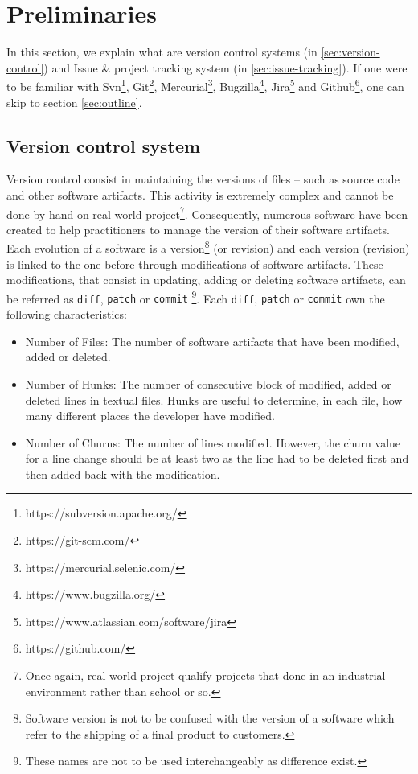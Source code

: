 \section{Preliminaries\label{sec:preliminaries}}


In this section, we explain what are version control systems (in \ref{sec:version-control}) and Issue \& project tracking system (in \ref{sec:issue-tracking}). If one were to be familiar with Svn\footnote{https://subversion.apache.org/}, Git\footnote{https://git-scm.com/}, Mercurial\footnote{https://mercurial.selenic.com/}, Bugzilla\footnote{https://www.bugzilla.org/}, Jira\footnote{https://www.atlassian.com/software/jira} and Github\footnote{https://github.com/}, one can skip to section \ref{sec:outline}.

\subsection{Version control system\label{sec:version-control}}

Version control consist in maintaining the versions of files -- such as source code and other software artifacts. 
This activity is extremely complex and cannot be done by hand on real world project\footnote{Once again, real world project qualify projects that done in an industrial environment rather than school or so.}. 
Consequently, numerous software have been created to help practitioners to manage the version of their software artifacts. 
Each evolution of a software is a version\footnote{Software version is not to be confused with the version of a software which refer to the shipping of a final product to customers.} (or revision) and each version (revision) is linked to the one before through modifications of software artifacts. 
These modifications, that consist in updating, adding or deleting software artifacts, can be referred as \texttt{diff}, {\tt patch} or {\tt commit}
\footnote{These names are not to be used interchangeably as difference exist.}. 
Each \texttt{diff}, {\tt patch} or {\tt commit} own the following characteristics:

\begin{itemize}
\item Number of Files: The number of software artifacts that have been modified, added or deleted.
\item Number of Hunks: The number of consecutive block of modified, added or deleted lines in textual files. Hunks are useful to determine, in each file, how many different places the developer have modified.
\item Number of Churns:  The number of lines modified. However, the churn value for a line change should be at least two as the line had to be deleted first and then added back with the modification.
\end{itemize}

